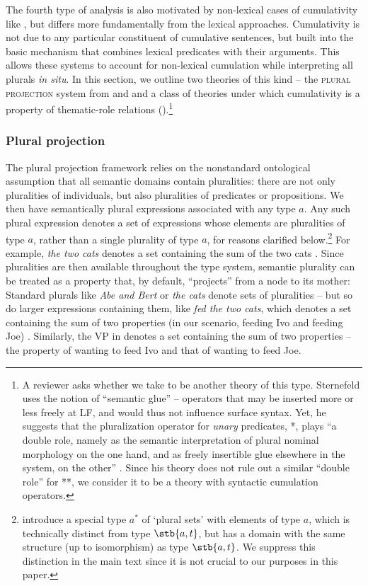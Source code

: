 \documentclass[output=paper]{langscibook}
\begin{document}
The fourth type of analysis is also motivated by non-lexical cases of cumulativity like , but differs more fundamentally from the lexical approaches. Cumulativity is not due to any particular constituent of cumulative sentences, but built into the basic mechanism that combines lexical predicates with their arguments. This allows these systems to account for non-lexical cumulation while interpreting all plurals \textit{in situ}. In this section, we outline two theories of this kind -- the \textsc{plural projection} system from \citet{Schmitt:2019} and \citet{Haslinger:2018a} and a class of theories under which cumulativity is a property of thematic-role relations (\citealt{Schein:1993,Landman:1996,Landman:2000,Kratzer:2003,Kratzer:2008,Ferreira:2005,Zweig:2008,Zweig:2009}).\footnote{A reviewer asks whether we take \citet{Sternefeld:1998} to be another theory of this type. Sternefeld uses the notion of 
``semantic glue'' -- operators that may be inserted more or less freely at LF, and would thus not influence surface syntax. Yet, he suggests that the pluralization operator for \textit{unary} predicates, *, plays ``a double role, namely as the semantic interpretation of plural nominal morphology on the one hand, and as freely insertible glue elsewhere in the system, on the other'' \citep[314, fn.~7]{Sternefeld:1998}. Since his theory does not rule out a similar ``double role'' for **, we consider it to be a theory with syntactic cumulation operators.}

\subsubsection{Plural projection}

The plural projection framework relies on the nonstandard ontological assumption that all semantic domains contain pluralities: there are not only pluralities of individuals, but also pluralities of predicates or propositions. We then have semantically plural expressions associated with any type $a$. Any such plural expression denotes a set of expressions whose elements are pluralities of type $a$, rather than a single plurality of type $a$, for reasons clarified below.\footnote{\citet{Haslinger:2018a} introduce a special type $a^*$ of `plural sets' with elements of type $a$, which is technically distinct from type $\stb{a, t}$, but has a domain with the same structure (up to isomorphism) as type $\stb{a, t}$. We suppress this distinction in the main text since it is not crucial to our purposes in this paper.} 
For example, \textit{the two cats} denotes a set containing the sum of the two cats . Since pluralities are then available throughout the type system, semantic plurality can be treated as a property that, by default, ``projects'' from a node to its mother: Standard plurals like \textit{Abe and Bert} or \textit{the cats} denote sets of pluralities -- but so do larger expressions containing them, like \textit{fed the two cats}, which denotes a set containing the sum of two properties (in our scenario, feeding Ivo and feeding Joe) . Similarly, the VP in  denotes a set containing the sum of two properties -- the property of wanting to feed Ivo and that of wanting to feed Joe.
\end{document}
